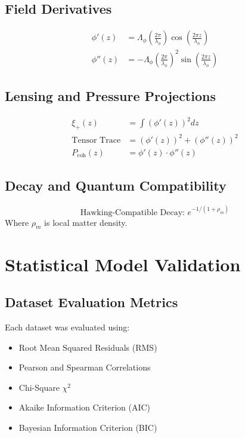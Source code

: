 \documentclass[11pt]{article}
\begin{document}
\subsection{Field Derivatives}
\begin{align}
\phi'(z) &= \Lambda_\phi \left(\frac{2\pi}{\lambda_\phi}\right) \cos\left(\frac{2\pi z}{\lambda_\phi}\right) \\
\phi''(z) &= -\Lambda_\phi \left(\frac{2\pi}{\lambda_\phi}\right)^2 \sin\left(\frac{2\pi z}{\lambda_\phi}\right)
\end{align}

\subsection{Lensing and Pressure Projections}
\begin{align}
\xi_+(z) &= \int \left(\phi'(z)\right)^2 dz \\
\text{Tensor Trace} &= \left(\phi'(z)\right)^2 + \left(\phi''(z)\right)^2 \\
P_\text{coh}(z) &= \phi'(z) \cdot \phi''(z)
\end{align}

\subsection{Decay and Quantum Compatibility}
\begin{equation}
\text{Hawking-Compatible Decay: } e^{-1/(1+\rho_m)}
\end{equation}
Where \( \rho_m \) is local matter density.

\section{Statistical Model Validation}
\subsection{Dataset Evaluation Metrics}
Each dataset was evaluated using:
\begin{itemize}
    \item Root Mean Squared Residuals (RMS)
    \item Pearson and Spearman Correlations
    \item Chi-Square \( \chi^2 \)
    \item Akaike Information Criterion (AIC)
    \item Bayesian Information Criterion (BIC)
\end{itemize}
\end{document}
